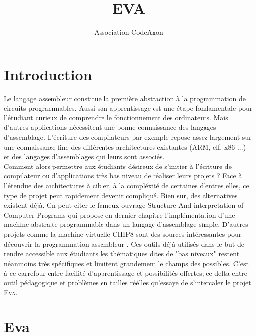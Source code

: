 \documentclass[11pt,twoside,french]{article}
\newcommand{\noun}[1]{\textsc{#1}}
\begin{document}
\title{EVA}
\author{Association CodeAnon}

\maketitle
\clearpage{}
\tableofcontents{}
\cleardoublepage{}
\vfill{}

\section{Introduction}

Le langage assembleur constitue la première abstraction à la programmation
de circuits programmables. Aussi son apprentissage est une étape fondamentale pour l'étudiant curieux de comprendre le fonctionnement des ordinateurs. Mais d'autres applications nécessitent une bonne connaissance des langages d'assemblage. L'écriture des compilateurs par exemple repose assez largement sur une connaissance fine des différentes architectures existantes (ARM, elf, x86 ...) et des langages d'assemblages qui leurs sont associés. \\

Comment alors permettre aux étudiants désireux de s'initier à l'écriture de compilateur ou d'applications très bas niveau de réaliser leurs projets ? Face à l'étendue des architectures à cibler, à la compléxité de certaines d'entres elles, ce type de projet peut rapidement devenir compliqué. Bien sur, des alternatives existent déjà. On peut citer le fameux ouvrage Structure And interpretation of Computer Programs \cite{SICP} qui propose en dernier chapitre l'implémentation d'une machine abstraite programmable dans un langage d'assemblage simple. D'autres projets comme la machine virtuelle CHIP8 sont des sources intéressantes pour découvrir la programmation assembleur \cite{CHIP8}. Ces outils déjà utilisés dans le but de rendre accessible aux étudiants les thématiques dites de "bas niveaux" restent néanmoins très spécifiques et limitent grandement le champs des possibles. C'est à ce carrefour entre facilité d'apprentissage et possibilités offertes; ce delta entre outil pédagogique et problèmes en tailles réélles qu'essaye de s'intercaler le projet \noun{Eva}. \\

\vfill{}
\newpage{}

\section{Eva}
\end{document}

